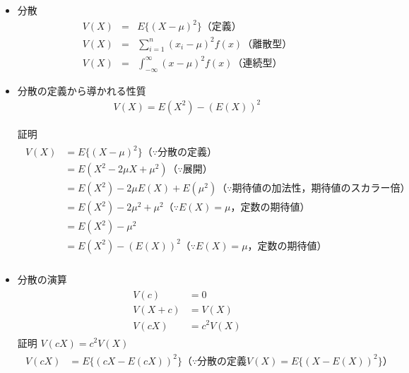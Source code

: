 \begin{itemize}
  \item 分散
        \begin{eqnarray}
          V(X) & = & E\{(X - \mu)^2\}（定義）\\
          V(X) & = & \sum_{i=1}^{n} (x_i - \mu)^2 f(x)（離散型）\\
          V(X) & = & \int_{-\infty}^{\infty} (x - \mu)^2 f(x)（連続型）
        \end{eqnarray}
  \item 分散の定義から導かれる性質
        \begin{eqnarray}
          V(X) = E(X^2) - (E(X))^2
        \end{eqnarray}

        証明
        \begin{eqnarray*}
          \begin{aligned}
            V(X) & = E\{(X - \mu)^2\}（\because 分散の定義）                                      \\
                 & = E(X^2 - 2\mu X + \mu^2)（\because 展開）                                     \\
                 & = E(X^2) - 2\mu E(X) + E(\mu^2)（\because 期待値の加法性，期待値のスカラー倍） \\
                 & = E(X^2) - 2\mu^2 + \mu^2（\because E(X) = \mu，定数の期待値）                 \\
                 & = E(X^2) - \mu^2                                                               \\
                 & = E(X^2) - (E(X))^2    （\because E(X) = \mu，定数の期待値）                   \\
          \end{aligned}
        \end{eqnarray*}
  \item 分散の演算
        \begin{eqnarray}
          \begin{aligned}
            V(c)     & = 0        \\
            V(X + c) & = V(X)     \\
            V(c X)   & = c^2 V(X)
          \end{aligned}
        \end{eqnarray}
        証明 $V(c X) = c^2 V(X)$
        \begin{eqnarray}
          \begin{aligned}
            V(c X) & = E\{(cX - E(cX))^2\}（\because 分散の定義 V(X) = E\{(X - E(X))^2\}） \\

\end{aligned}
\end{eqnarray}
\end{itemize}
